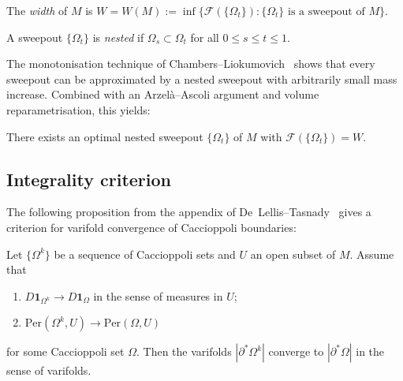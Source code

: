 \begin{definition}[Width]\label{def:p2-width}
The \emph{width} of $M$ is
$W = W(M) := \inf\bigl\{\mathcal{F}(\{\Omega_t\}) : \{\Omega_t\} \text{ is a sweepout of } M\bigr\}$.
\end{definition}

\begin{definition}\label{def:p2-nested}
A sweepout $\{\Omega_t\}$ is \emph{nested} if $\Omega_s \subset \Omega_t$ for all $0 \leq s \leq t \leq 1$.
\end{definition}

The monotonisation technique of Chambers--Liokumovich~\cite{CL20} shows that every sweepout can be approximated by a nested sweepout with arbitrarily small mass increase. Combined with an Arzel\`a--Ascoli argument and volume reparametrisation, this yields:

\begin{proposition}\label{prop:p2-onvp-existence}
There exists an optimal nested sweepout $\{\Omega_t\}$ of $M$ with $\mathcal{F}(\{\Omega_t\}) = W$.
\end{proposition}

\subsection{Integrality criterion}

The following proposition from the appendix of De~Lellis--Tasnady~\cite{DLT13} gives a criterion for varifold convergence of Caccioppoli boundaries:

\begin{proposition}\label{prop:p2-DLT-integrality}
    Let $\{\Omega^k\}$ be a sequence of Caccioppoli sets and $U$ an open subset of $M$. Assume that
    \begin{enumerate}[label=\textup{(\roman*)}]
        \item $D\mathbf{1}_{\Omega^k} \to D\mathbf{1}_\Omega$ in the sense of measures in $U$;
        \item $\mathrm{Per}(\Omega^k, U) \to \mathrm{Per}(\Omega, U)$
    \end{enumerate}
    for some Caccioppoli set $\Omega$. Then the varifolds $|\partial^*\Omega^k|$ converge to $|\partial^*\Omega|$ in the sense of varifolds.
\end{proposition}

